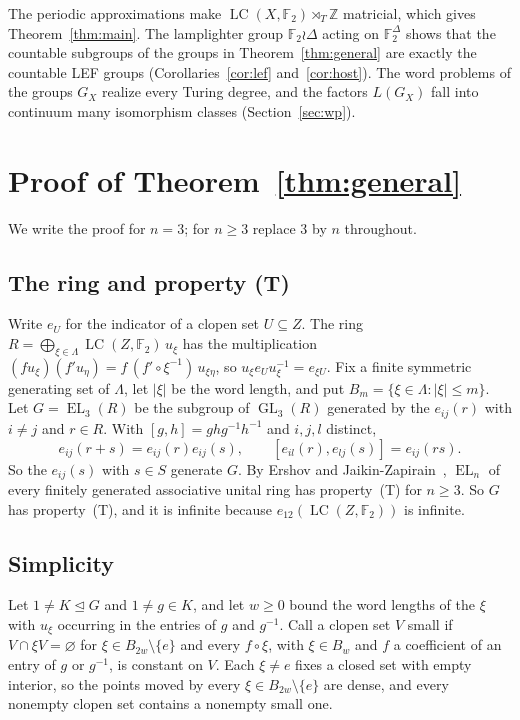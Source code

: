 \documentclass[11pt]{amsart}
\newcommand{\F}{\mathbb F}
\newcommand{\Z}{\mathbb Z}
\newcommand{\LC}{\operatorname{LC}}
\newcommand{\EL}{\operatorname{EL}}
\newcommand{\GL}{\operatorname{GL}}
\begin{document}
The periodic approximations make $\LC(X,\F_2)\rtimes_T\Z$ matricial, which
gives Theorem~\ref{thm:main}. The lamplighter group $\F_2\wr\Delta$ acting
on $\F_2^{\Delta}$ shows that the countable subgroups of the groups in
Theorem~\ref{thm:general} are exactly the countable LEF groups
(Corollaries~\ref{cor:lef} and~\ref{cor:host}). The word problems of the
groups $G_X$ realize every Turing degree, and the factors $L(G_X)$ fall
into continuum many isomorphism classes (Section~\ref{sec:wp}).

\section{Proof of Theorem~\ref{thm:general}}\label{sec:proof}

We write the proof for $n=3$; for $n\ge3$ replace $3$ by $n$ throughout.

\subsection*{The ring and property (T)}
Write $e_U$ for the indicator of a clopen set $U\subseteq Z$. The ring
$R=\bigoplus_{\xi\in\Lambda}\LC(Z,\F_2)\,u_\xi$ has the multiplication
$(fu_\xi)(f'u_\eta)=f\,(f'\circ\xi^{-1})\,u_{\xi\eta}$, so
$u_\xi e_Uu_\xi^{-1}=e_{\xi U}$. Fix a finite symmetric generating set of
$\Lambda$, let $|\xi|$ be the word length, and put
$B_m=\{\xi\in\Lambda:|\xi|\le m\}$. Let $G=\EL_3(R)$ be the subgroup of
$\GL_3(R)$ generated by the $e_{ij}(r)$ with $i\ne j$ and $r\in R$. With
$[g,h]=ghg^{-1}h^{-1}$ and $i,j,l$ distinct,
\begin{equation}\label{eq:elementary}
 e_{ij}(r+s)=e_{ij}(r)e_{ij}(s),\qquad [e_{il}(r),e_{lj}(s)]=e_{ij}(rs).
\end{equation}
So the $e_{ij}(s)$ with $s\in S$ generate $G$. By Ershov and
Jaikin-Zapirain~\cite[Theorem~1.1]{EJZ}, $\EL_n$ of every finitely
generated associative unital ring has property~\textup{(T)} for $n\ge3$.
So $G$ has property~\textup{(T)}, and it is infinite because
$e_{12}(\LC(Z,\F_2))$ is infinite.

\subsection*{Simplicity}
Let $1\ne K\trianglelefteq G$ and $1\ne g\in K$, and let $w\ge0$ bound the
word lengths of the $\xi$ with $u_\xi$ occurring in the entries of $g$ and
$g^{-1}$. Call a clopen set $V$ small if $V\cap\xi V=\varnothing$ for
$\xi\in B_{2w}\setminus\{e\}$ and every $f\circ\xi$, with $\xi\in B_w$ and
$f$ a coefficient of an entry of $g$ or $g^{-1}$, is constant on $V$.
Each $\xi\ne e$ fixes a closed set with empty interior, so the points
moved by every $\xi\in B_{2w}\setminus\{e\}$ are dense, and every nonempty
clopen set contains a nonempty small one.
\end{document}
